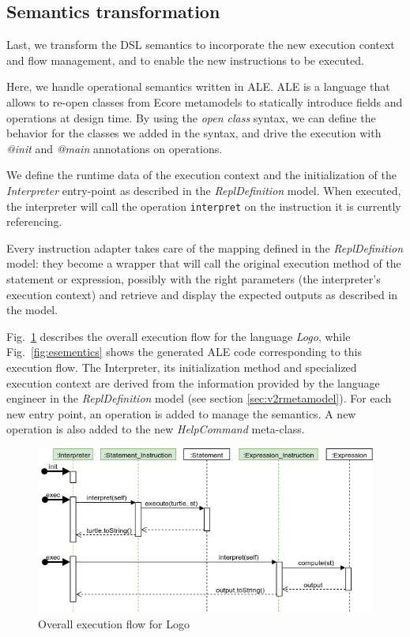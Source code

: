 \subsection{Semantics transformation}

Last, we transform the DSL semantics to incorporate the new execution context and flow management, and to enable the new instructions to be executed.

Here, we handle operational semantics written in ALE.
ALE is a language that allows to re-open classes from Ecore metamodels to statically introduce fields and operations at design time.
By using the \textit{open class} syntax, we can define the behavior for the classes we added in the syntax, and drive the execution with \textit{@init} and \textit{@main} annotations on operations.

We define the runtime data of the execution context and the initialization of the \textit{Interpreter} entry-point as described in the \emph{ReplDefinition} model.
When executed, the interpreter will call the operation \verb|interpret| on the instruction it is currently referencing.

Every instruction adapter takes care of the mapping defined in the \textit{ReplDefinition} model: they become a wrapper that will call the original execution method of the statement or expression, possibly with the right parameters (the interpreter's execution context) and retrieve and display the expected outputs as described in the model.

Fig.~\ref{fig:sem} describes the overall execution flow for the language \textit{Logo}, while Fig.~\ref{fig:esementics} shows the generated ALE code corresponding to this execution flow. The Interpreter, its initialization method and specialized execution context are derived from the information provided by the language engineer in the \emph{ReplDefinition} model (see section \ref{sec:v2rmetamodel}). For each new entry point, an operation is added to manage the semantics. A new operation is also added to the new \textit{HelpCommand} meta-class. 

\begin{figure}[t]
	\centering
	\includegraphics[width=\linewidth]{figures/sle_semantics.png}
	\caption{Overall execution flow for Logo}
	\label{fig:sem}
\end{figure}

